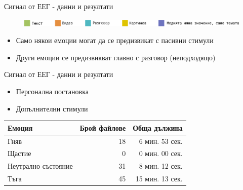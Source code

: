 \documentclass[9pt]{beamer}
\begin{document}
\begin{frame}[c]{Сигнал от ЕЕГ - данни и резултати}
\begin{figure}[H]
{            }
            \hfill
            \vspace{1cm}
            \includegraphics[width=\textwidth]{legend}%
        \end{figure}
        \begin{itemize}
            \item Само някои емоции могат да се предизвикат с пасивни стимули
            \item Други емоции се предизвикват главно с разговор (неподходящо)
        \end{itemize}
    \end{frame}
    
    \begin{frame}[t]{Сигнал от ЕЕГ - данни и резултати}
        \begin{itemize}
            \pause
            \item Персонална постановка
            \pause
            \item Допълнителни стимули 
        \end{itemize}
        \pause
        \begin{center}
            \begin{tabular}{|l|r|r|} 
                \hline
                Емоция & Брой файлове & Обща дължина\\ 
                \hline
                Гняв & 18 & 6 мин. 53 сек.\\ 
                Щастие & 0 & 0 мин. 00 сек. \\ 
                Неутрално състояние & 31 & 8 мин. 12 сек. \\ 
                Тъга & 45 & 15 мин. 13 сек. \\ 
                \hline
            \end{tabular}
        \end{center}
    \end{frame}
\end{document}

